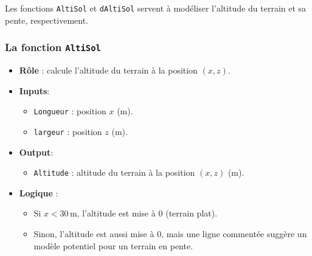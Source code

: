 \documentclass[10pt,a4paper]{report}
\begin{document}
Les fonctions \texttt{AltiSol} et \texttt{dAltiSol} servent à modéliser l'altitude du terrain et sa pente, respectivement.

\subsubsection{La fonction \texttt{AltiSol}}
\begin{itemize}
    \item \textbf{Rôle} : calcule l'altitude du terrain à la position \((x, z)\).
    \item \textbf{Inputs}:
    \begin{itemize}
        \item \texttt{Longueur} : position \(x\) (m).
        \item \texttt{largeur} : position \(z\) (m).
    \end{itemize}
    \item \textbf{Output}:
    \begin{itemize}
        \item \texttt{Altitude} : altitude du terrain à la position \((x, z)\) (m).
    \end{itemize}
    \item \textbf{Logique} :
    \begin{itemize}
        \item Si \(x < 30 \, \text{m}\), l'altitude est mise à \(0\) (terrain plat).
        \item Sinon, l'altitude est aussi mise à \(0\), mais une ligne commentée suggère un modèle potentiel pour un terrain en pente.
    \end{itemize}
\end{itemize}
\end{document}
